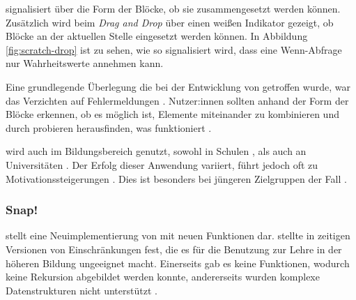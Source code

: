 \Scratch{} signalisiert über die Form der Blöcke, ob sie zusammengesetzt werden können. Zusätzlich wird beim \textit{Drag and Drop} über einen weißen Indikator gezeigt, ob Blöcke an der aktuellen Stelle eingesetzt werden können. In Abbildung \ref{fig:scratch-drop} ist zu sehen, wie so signalisiert wird, dass eine Wenn-Abfrage nur Wahrheitswerte annehmen kann.

Eine grundlegende Überlegung die bei der Entwicklung von \Scratch{} getroffen wurde, war das Verzichten auf Fehlermeldungen \parencite{maloneyScratchProgramming2010}. Nutzer:innen sollten anhand der Form der Blöcke erkennen, ob es möglich ist, Elemente miteinander zu kombinieren und durch probieren herausfinden, was funktioniert \parencite{maloneyScratchProgramming2010}.

\Scratch{} wird auch im Bildungsbereich genutzt, sowohl in Schulen \parencite{ortiz-colonTeachingScratch2016}, als auch an Universitäten \parencite{dekerekiScratchApplications2008}. Der Erfolg dieser Anwendung variiert, führt jedoch oft zu Motivationssteigerungen \parencite{dekerekiScratchApplications2008, martinez-valdesRelativelyUnsatisfactory2017}. Dies ist besonders bei jüngeren Zielgruppen der Fall \parencite{ortiz-colonTeachingScratch2016}.

\subsubsection{Snap!}
\Snap{} stellt eine Neuimplementierung von \Scratch{} mit neuen Funktionen dar. \textcite{harveyBringingNo2010} stellte in zeitigen Versionen von \Scratch{} Einschränkungen fest, die es für die Benutzung zur Lehre in der höheren Bildung ungeeignet macht. Einerseits gab es keine Funktionen, wodurch keine Rekursion abgebildet werden konnte, andererseits wurden komplexe Datenstrukturen nicht unterstützt \parencite{harveyBringingNo2010}.

